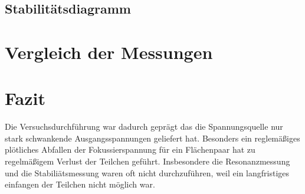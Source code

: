 \documentclass[a4paper,12pt]{article}
\begin{document}
\subsection{Stabilitätsdiagramm}

\section{Vergleich der Messungen}

\section{Fazit}
Die Versuchsdurchführung war dadurch geprägt das die Spannungsquelle nur stark schwankende Ausgangsspannungen geliefert hat. Besonders ein reglemäßiges plötliches Abfallen der Fokussierspannung für ein 
Flächenpaar hat zu regelmäßigem Verlust der Teilchen geführt. Insbesondere die Resonanzmessung und die Stabiliätsmessung waren oft nicht durchzuführen, weil ein langfristiges einfangen der Teilchen nicht
möglich war.

\end{document}
